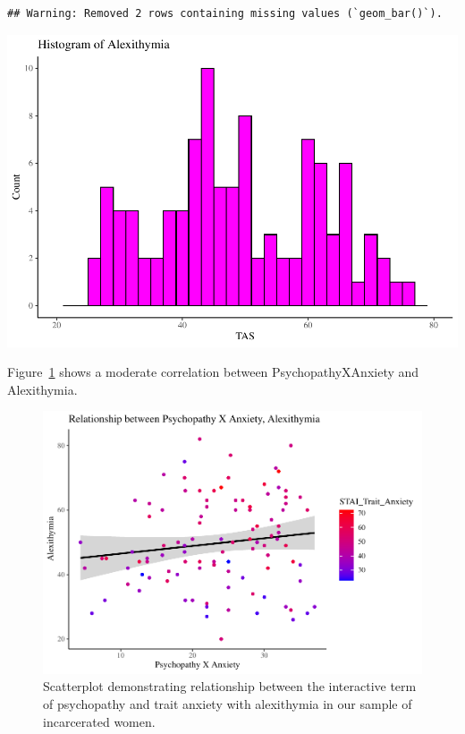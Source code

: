 \documentclass[
  man,floatsintext]{apa6}
\begin{document}
\begin{verbatim}
## Warning: Removed 2 rows containing missing values (`geom_bar()`).
\end{verbatim}

\includegraphics{d2m-Psychopathy_files/figure-latex/TAS-descriptives-1.pdf}

Figure~\ref{fig:c-path-scatterplot} shows a moderate correlation between PsychopathyXAnxiety and Alexithymia.



\begin{figure}
\includegraphics[width=1\linewidth]{d2m-Psychopathy_files/figure-latex/c-path-scatterplot-1} \caption{Scatterplot demonstrating relationship between the interactive term of psychopathy and trait anxiety with alexithymia in our sample of incarcerated women.}\label{fig:c-path-scatterplot}
\end{figure}
\end{document}
